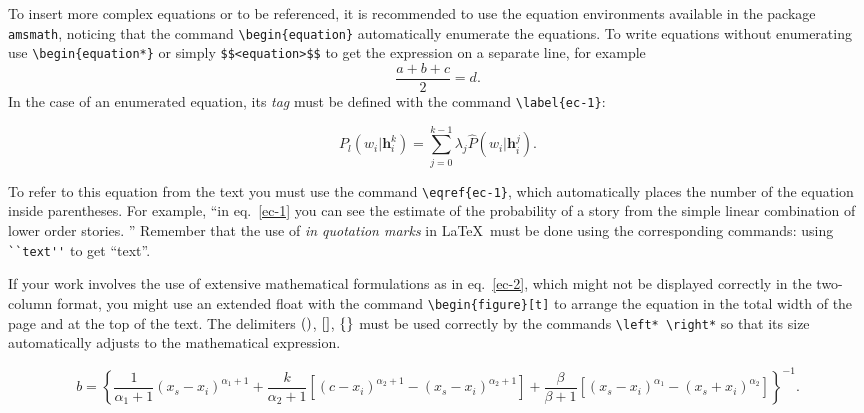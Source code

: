 \documentclass[eng,blind]{ajceam-class}
\newcommand{\vect}[1]{\mathbf{#1}}  %
\begin{document}
To insert more complex equations or to be referenced, it is recommended to use the equation environments available in the package \verb!amsmath!, noticing that the command \verb!\begin{equation}! automatically enumerate the equations. To write equations without enumerating use \verb!\begin{equation*}! or simply \verb!$$<equation>$$! to get the expression on a separate line, for example $$ \frac{a + b + c}{2} = d. $$ In the case of an enumerated equation, its \emph{tag} must be defined with the command \verb!\label{ec-1}!:

\begin{equation} \label{ec-1}
 P_l(w_i|\vect{h}_i^{k}) = \sum_{j=0}^{k-1} \lambda_j \hat{P}(w_i|\vect{h}_i^{j}).
\end{equation}

To refer to this equation from the text you must use the command \verb!\eqref{ec-1}!, which automatically places the number of the equation inside parentheses. For example, ``in eq.~\eqref{ec-1} you can see the estimate of the probability of a story from the simple linear combination of lower order stories. '' Remember that the use of \emph{in quotation marks} in \LaTeX\ must be done using the corresponding commands: using \verb!``text''! to get ``text''.

If your work involves the use of extensive mathematical formulations as in eq.~\eqref{ec-2}, which might not be displayed correctly in the two-column format, you might use an extended float with the command \verb!\begin{figure}[t]! to arrange the equation in the total width of the page and at the top of the text. The delimiters  $(\mbox)$, $[\mbox]$, $\{\mbox\}$  must be used correctly by the commands \verb!\left* \right*! so that its size automatically adjusts to the mathematical expression. %

\begin{figure}[!t]
 \begin{equation}\label{ec-2}
   b = \left\{\frac{1}{\alpha_1 + 1}\left(x_s - x_i\right)^{\alpha_1+1} + \frac{k}{\alpha_2 + 1}
   \left[\left(c - x_i\right)^{\alpha_2+1} - \left(x_s - x_i\right)^{\alpha_2+1}\right]
   + \frac{\beta}{\beta + 1}\left[\left(x_s - x_i\right)^{\alpha_1} - 
   \left(x_s + x_i\right)^{\alpha_2}\right]\right\}^{-1}.
 \end{equation}
\end{figure}
\end{document}
